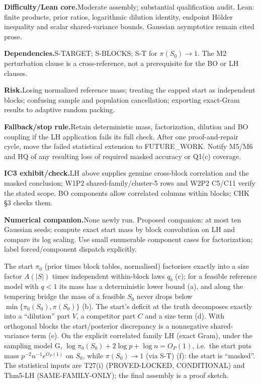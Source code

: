 {\par\smallskip\noindent\textbf{Difficulty/Lean core.}\enspace Moderate assembly; substantial qualification audit. Lean: finite products, prior ratios, logarithmic dilution identity, endpoint Hölder inequality and scalar shared-variance bounds. Gaussian asymptotics remain cited prose.
\par\smallskip\noindent\textbf{Dependencies.}\enspace S-TARGET; S-BLOCKS; S-T for \(\pi(S_0)\to1\). The M2 perturbation clause is a cross-reference, not a prerequisite for the BO or LH clauses.
\par\smallskip\noindent\textbf{Risk.}\enspace Losing normalized reference mass; treating the capped start as independent blocks; confusing sample and population cancellation; exporting exact-Gram results to adaptive random packing.
\par\smallskip\noindent\textbf{Fallback/stop rule.}\enspace Retain deterministic mass, factorization, dilution and BO coupling if the LH application fails its full check. After one proof-and-repair cycle, move the failed statistical extension to FUTURE\_WORK. Notify M5/M6 and HQ of any resulting loss of required masked accuracy or Q1(c) coverage.
\par\smallskip\noindent\textbf{IC3 exhibit/check.}\enspace LH above supplies genuine cross-block correlation and the masked conclusion; W1P2 shared-family/cluster-5 rows and W2P2 C5/C11 verify the stated scope. BO components allow correlated columns within blocks; CHK §3 checks them.
\par\smallskip\noindent\textbf{Numerical companion.}\enspace None newly run. Proposed companion: at most ten Gaussian seeds; compute exact start mass by block convolution on LH and compare its log scaling. Use small enumerable component cases for factorization; label forced/component dispatch explicitly.
}

\begin{plain}
The start $\pi_0$ (prior times block tables, normalised) factorises exactly into a size factor $A(|S|)$ times independent within-block laws $q_b$ (c); for a feasible reference model with $q<1$ its mass has a deterministic lower bound (a), and along the tempering bridge the mass of a feasible $S_0$ never drops below $\min\{\pi_0(S_0),\pi(S_0)\}$ (b). The start's deficit at the truth decomposes exactly into a ``dilution'' part $V$, a competitor part $C$ and a size term (d). With orthogonal blocks the start/posterior discrepancy is a nonnegative shared-variance term (e). On the explicit correlated family LH (exact Gram), under the sampling model G, $\log\pi_0(S_0)+2\log p+\log n=O_P(1)$, i.e.\ the start puts mass $p^{-2}n^{-1}e^{O_P(1)}$ on $S_0$, while $\pi(S_0)\to1$ (via S-T) (f): the start is ``masked''. The statistical inputs are T27(i) (PROVED-LOCKED, CONDITIONAL) and Thm5-LH (SAME-FAMILY-ONLY); the final assembly is a proof sketch.
\end{plain}

